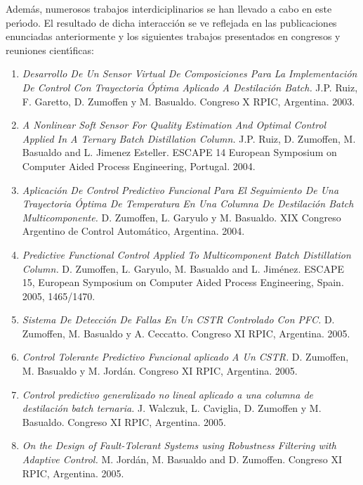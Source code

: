 Adem{\'a}s, numerosos trabajos interdiciplinarios se han llevado a cabo en este per{\'\i}odo. El resultado de dicha interacci{\'o}n se ve reflejada en las
publicaciones enunciadas anteriormente y los siguientes trabajos presentados en congresos y reuniones cient{\'\i}ficas:
\begin{enumerate}
\small \item \textit{Desarrollo De Un Sensor Virtual De Composiciones Para La Implementaci{\'o}n De Control
 Con Trayectoria {\'O}ptima Aplicado A Destilaci{\'o}n Batch.} J.P. Ruiz, F. Garetto, D. Zumoffen y M.
 Basualdo. Congreso X RPIC, Argentina. 2003.

\item \textit{A Nonlinear Soft Sensor For Quality Estimation And Optimal Control Applied In A Ternary Batch Distillation Column.} J.P. Ruiz, D.
Zumoffen, M. Basualdo and L. Jimenez  Esteller. ESCAPE 14 European Symposium on Computer Aided Process Engineering, Portugal. 2004.

\item \textit{Aplicaci{\'o}n De Control Predictivo Funcional Para El Seguimiento De Una Trayectoria {\'O}ptima De Temperatura En Una Columna De Destilaci{\'o}n
Batch Multicomponente.} D. Zumoffen, L. Garyulo y M. Basualdo. XIX Congreso Argentino de Control Autom{\'a}tico, Argentina. 2004.

\item \textit{Predictive Functional Control Applied To Multicomponent Batch Distillation Column.} D. Zumoffen, L. Garyulo, M. Basualdo and L.
Jim{\'e}nez. ESCAPE 15, European Symposium on Computer Aided Process Engineering, Spain. 2005, 1465/1470.

\item \textit{Sistema De Detecci{\'o}n De Fallas En Un CSTR Controlado Con PFC.} D. Zumoffen, M. Basualdo y A. Ceccatto. Congreso XI RPIC, Argentina.
2005.

\item \textit{Control Tolerante Predictivo Funcional aplicado A Un CSTR.} D. Zumoffen, M. Basualdo y M. Jord{\'a}n. Congreso XI RPIC, Argentina. 2005.

\item \textit{Control predictivo generalizado no lineal aplicado a una columna de destilaci{\'o}n batch ternaria.} J. Walczuk, L. Caviglia, D. Zumoffen y
M. Basualdo. Congreso XI RPIC, Argentina. 2005.

\item \textit{On the Design of Fault-Tolerant Systems using Robustness Filtering with Adaptive Control.} M. Jord{\'a}n, M. Basualdo and D. Zumoffen.
Congreso XI RPIC, Argentina. 2005.


\end{enumerate}
